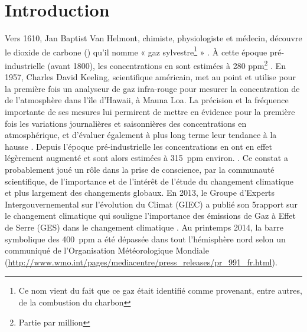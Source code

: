 
\chapter*{Introduction}
\newpage



Vers 1610, Jan Baptist Van Helmont, chimiste, physiologiste et médecin, découvre le dioxide de carbone (\coo) qu'il nomme « gaz sylvestre\footnote{Ce nom vient du fait que ce gaz était identifié comme provenant, entre autres, de la combustion du charbon} » \citep{philippedesouabe-zyriane1988}.
À cette époque pré-industrielle (avant 1800), les concentrations en \coo sont estimées à 280 ppm\footnote{Partie par million} \citep{Siegenthaler1987}.
En 1957, Charles David Keeling, scientifique américain, met au point et utilise pour la première fois un analyseur de gaz infra-rouge pour mesurer la concentration de \coo de l'atmosphère dans l'île d'Hawaii, à Mauna Loa.
La précision et la fréquence importante de ses mesures lui permirent de mettre en évidence pour la première fois les variations journalières et saisonnières des concentrations en \coo atmosphérique, et d'évaluer également à plus long terme leur tendance à la hausse \citep{harris2010}.
Depuis l'époque pré-industrielle les concentrations en \coo ont en effet légèrement augmenté et sont alors estimées à \SI{315}{ppm} environ. \citep{pales1965}.
Ce constat a probablement joué un rôle dans la prise de conscience, par la communauté scientifique, de l'importance et de l'intérêt de l'étude du changement climatique et plus largement des changements globaux.
En 2013, le Groupe d'Experts Intergouvernemental sur l'évolution du Climat (GIEC) a publié son 5\ieme rapport sur le changement climatique qui souligne l'importance des émissions de Gaz à Effet de Serre (GES) dans le changement climatique \citep{stocker2013}.
Au printemps 2014, la barre symbolique des \SI{400}{ppm} a été dépassée dans tout l'hémisphère nord selon un communiqué de l'Organisation Météorologique Mondiale (\url{http://www.wmo.int/pages/mediacentre/press_releases/pr_991_fr.html}).

